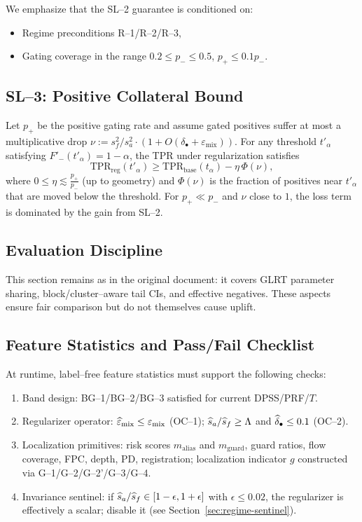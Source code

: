 We emphasize that the SL--2 guarantee is conditioned on:
\begin{itemize}[nosep]
  \item Regime preconditions R--1/R--2/R--3,
  \item Gating coverage in the range $0.2\le p_-\le 0.5$, $p_+\le 0.1p_-$.
\end{itemize}

\subsection{SL--3: Positive Collateral Bound}

Let $p_+$ be the positive gating rate and assume gated positives suffer at most a multiplicative drop $\nu := s_f^2/s_a^2\cdot(1+O(\delta_\bullet+\varepsilon_{\text{mix}}))$. For any threshold $t'_\alpha$ satisfying $F'_-(t'_\alpha)=1-\alpha$, the TPR under regularization satisfies
\[
\mathrm{TPR}_{\text{reg}}(t'_\alpha) \ge \mathrm{TPR}_{\text{base}}(t_\alpha) - \eta\,\Phi(\nu),
\]
where $0\le \eta\lesssim \frac{p_+}{p_-}$ (up to geometry) and $\Phi(\nu)$ is the fraction of positives near $t'_\alpha$ that are moved below the threshold. For $p_+\ll p_-$ and $\nu$ close to $1$, the loss term is dominated by the gain from SL--2.

\subsection{Evaluation Discipline}
\label{app:ka-eval}

This section remains as in the original document: it covers GLRT parameter sharing, block/cluster--aware tail CIs, and effective negatives. These aspects ensure fair comparison but do not themselves cause uplift.

\subsection{Feature Statistics and Pass/Fail Checklist}
\label{sec:telemetry}

At runtime, label--free feature statistics must support the following checks:

\begin{enumerate}[label=(\roman*),nosep]
  \item Band design: BG--1/BG--2/BG--3 satisfied for current DPSS/PRF/$T$.
  \item Regularizer operator: $\widehat\varepsilon_{\text{mix}}\le\varepsilon_{\text{mix}}$ (OC--1); $\widehat s_a/\widehat s_f\ge\Lambda$ and $\widehat\delta_\bullet\le 0.1$ (OC--2).
  \item Localization primitives: risk scores $m_{\text{alias}}$ and $m_{\text{guard}}$, guard ratios, flow coverage, FPC, depth, PD, registration; localization indicator $g$ constructed via G--1/G--2/G--2'/G--3/G--4.
  \item Invariance sentinel: if $\widehat s_a/\widehat s_f\in[1-\epsilon,1+\epsilon]$ with $\epsilon\le 0.02$, the regularizer is effectively a scalar; disable it (see Section~\ref{sec:regime-sentinel}).
\end{enumerate}

